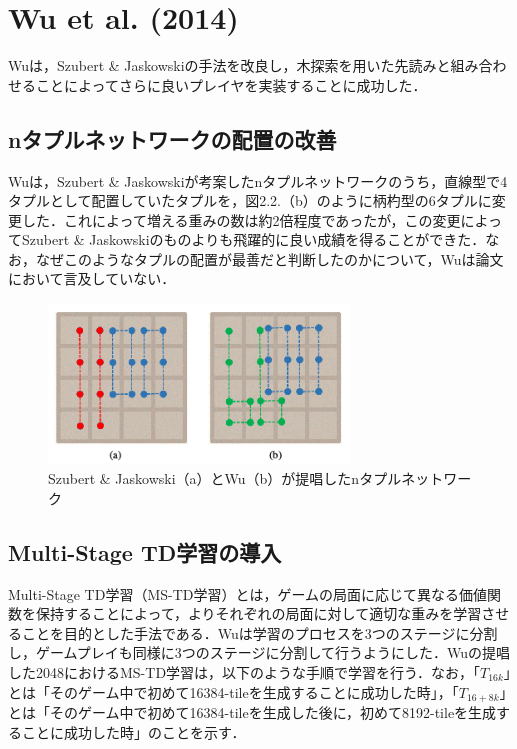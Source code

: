\documentclass{suribt}
\begin{document}
\section{Wu et al. (2014)}
Wuは，Szubert \& Jaskowskiの手法を改良し，木探索を用いた先読みと組み合わせることによってさらに良いプレイヤを実装することに成功した．
\subsection{nタプルネットワークの配置の改善}
Wuは，Szubert \& Jaskowskiが考案したnタプルネットワークのうち，直線型で4タプルとして配置していたタプルを，図2.2.（b）のように柄杓型の6タプルに変更した．これによって増える重みの数は約2倍程度であったが，この変更によってSzubert \& Jaskowskiのものよりも飛躍的に良い成績を得ることができた．なお，なぜこのようなタプルの配置が最善だと判断したのかについて，Wuは論文において言及していない．

\begin{figure}[H]
	\centering
	\includegraphics[width=8cm]{figure_002.png}
	\caption{Szubert \& Jaskowski（a）とWu（b）が提唱したnタプルネットワーク}
\end{figure}

\subsection{Multi-Stage TD学習の導入}
Multi-Stage TD学習（MS-TD学習）とは，ゲームの局面に応じて異なる価値関数を保持することによって，よりそれぞれの局面に対して適切な重みを学習させることを目的とした手法である．Wuは学習のプロセスを3つのステージに分割し，ゲームプレイも同様に3つのステージに分割して行うようにした．Wuの提唱した2048におけるMS-TD学習は，以下のような手順で学習を行う．なお，「$T_{16k}$」とは「そのゲーム中で初めて16384-tileを生成することに成功した時」，「$T_{16+8k}$」とは「そのゲーム中で初めて16384-tileを生成した後に，初めて8192-tileを生成することに成功した時」のことを示す．
\end{document}
